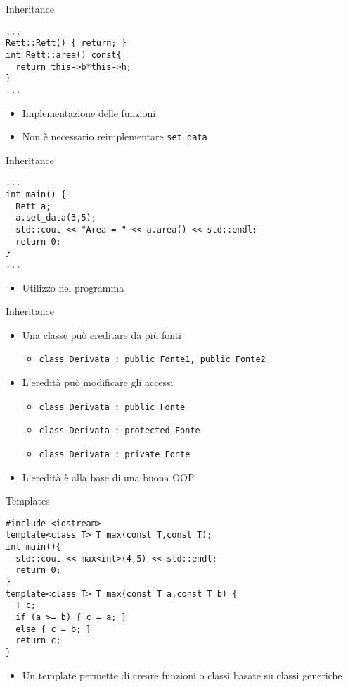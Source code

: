 \begin{frame}[fragile]{Inheritance}
  \vfill
  \begin{lstlisting}[firstnumber=19]
...
Rett::Rett() { return; }
int Rett::area() const{
  return this->b*this->h;
}
...\end{lstlisting}
  \vfill
  \begin{itemize}
    \item Implementazione delle funzioni
    \vfill
    \item Non è necessario reimplementare \lstinline$set_data$
  \end{itemize}
  \vfill
\end{frame}

\begin{frame}[fragile]{Inheritance}
  \vfill
  \begin{lstlisting}[firstnumber=23]
...
int main() {
  Rett a;
  a.set_data(3,5);
  std::cout << "Area = " << a.area() << std::endl;
  return 0;
}
...\end{lstlisting}
  \vfill
  \begin{itemize}
    \item Utilizzo nel programma
  \end{itemize}
  \vfill
\end{frame}

\begin{frame}[fragile]{Inheritance}
  \vfill
  \begin{itemize}
    \item Una classe può ereditare da più fonti
    \begin{itemize}
      \item \lstinline$class Derivata : public Fonte1, public Fonte2$
    \end{itemize}
    \vfill
    \item L'eredità può modificare gli accessi
    \begin{itemize}
      \item \lstinline$class Derivata : public Fonte$
      \item \lstinline$class Derivata : protected Fonte$
      \item \lstinline$class Derivata : private Fonte$
    \end{itemize}
    \vfill
    \item L'eredità è alla base di una buona OOP
  \end{itemize}
  \vfill
\end{frame}

\begin{frame}[fragile]{Templates}
  \vfill
  \begin{lstlisting}
#include <iostream>
template<class T> T max(const T,const T);
int main(){
  std::cout << max<int>(4,5) << std::endl;
  return 0;
}
template<class T> T max(const T a,const T b) {
  T c;
  if (a >= b) { c = a; }
  else { c = b; }
  return c;
}
  \end{lstlisting}
  \vfill
  \begin{itemize}
    \item Un \alert{template} permette di creare funzioni o classi basate su classi generiche
  \end{itemize}
  \vfill
\end{frame}

